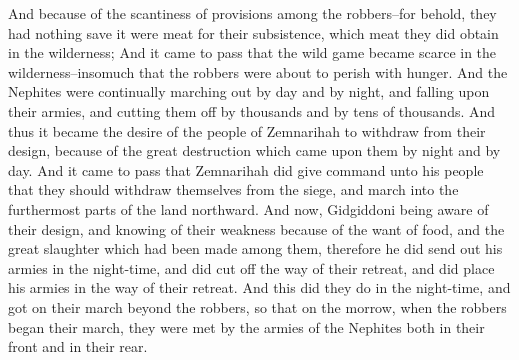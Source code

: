And because of the scantiness of provisions among the robbers--for behold, they had nothing save it were meat for their subsistence, which meat they did obtain in the wilderness;
\bverse \iffalse And it came to pass that the wild game became scarce in the wilderness--insomuch that the robbers were about to perish with hunger. \fi
And it came to pass that the wild game became scarce in the wilderness--insomuch that the robbers were about to perish with hunger.
\bverse \iffalse And the Nephites were continually marching out by day and by night, and falling upon their armies, and cutting them off by thousands and by tens of thousands. \fi
And the Nephites were continually marching out by day and by night, and falling upon their armies, and cutting them off by thousands and by tens of thousands.
\bverse \iffalse And thus it became the desire of the people of Zemnarihah to withdraw from their design, because of the great destruction which came upon them by night and by day. \fi
And thus it became the desire of the people of Zemnarihah to withdraw from their design, because of the great destruction which came upon them by night and by day.
\bverse \iffalse And it came to pass that Zemnarihah did give command unto his people that they should withdraw themselves from the siege, and march into the furthermost parts of the land northward. \fi
And it came to pass that Zemnarihah did give command unto his people that they should withdraw themselves from the siege, and march into the furthermost parts of the land northward.
\bverse \iffalse And now, Gidgiddoni being aware of their design, and knowing of their weakness because of the want of food, and the great slaughter which had been made among them, therefore he did send out his armies in the night-time, and did cut off the way of their retreat, and did place his armies in the way of their retreat. \fi
And now, Gidgiddoni being aware of their design, and knowing of their weakness because of the want of food, and the great slaughter which had been made among them, therefore he did send out his armies in the night-time, and did cut off the way of their retreat, and did place his armies in the way of their retreat.
\bverse \iffalse And this did they do in the night-time, and got on their march beyond the robbers, so that on the morrow, when the robbers began their march, they were met by the armies of the Nephites both in their front and in their rear. \fi
And this did they do in the night-time, and got on their march beyond the robbers, so that on the morrow, when the robbers began their march, they were met by the armies of the Nephites both in their front and in their rear.
